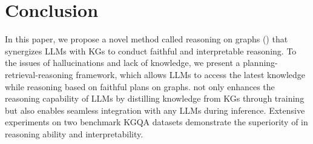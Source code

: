 \section{Conclusion}
In this paper, we propose a novel method called reasoning on graphs (\ourmethod) that synergizes LLMs with KGs to conduct faithful and interpretable reasoning. To  the issues of hallucinations and lack of knowledge, we present a planning-retrieval-reasoning framework, which allows LLMs to access the latest knowledge while reasoning based on faithful plans on graphs. \ourmethod not only enhances the reasoning capability of LLMs by distilling knowledge from KGs through training but also enables seamless integration with any LLMs during inference. Extensive experiments on two benchmark KGQA datasets demonstrate the superiority of \ourmethod in reasoning ability and interpretability.